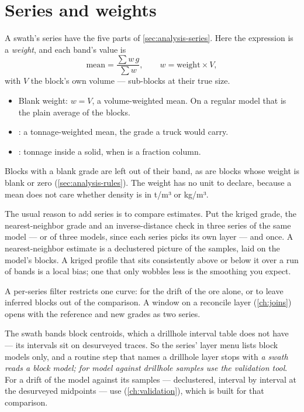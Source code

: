 \section{Series and weights}\label{sec:swath-series}
A swath's series have the five parts of \cref{sec:analysis-series}. Here the expression is a \emph{weight}, and each band's value is
\[ \text{mean} = \frac{\sum w\,g}{\sum w}, \qquad w = \text{weight} \times V , \]
with $V$ the block's own volume — sub-blocks at their true size.

\begin{itemize}
\item Blank weight: $w = V$, a volume-weighted mean. On a regular model that is the plain average of the blocks.
\item {}: a tonnage-weighted mean, the grade a truck would carry.
\item {}: tonnage inside a solid, when  is a fraction column.
\end{itemize}

Blocks with a blank grade are left out of their band, as are blocks whose weight is blank or zero (\cref{sec:analysis-rules}). The weight has no unit to declare, because a mean does not care whether density is in t/m³ or kg/m³.

The usual reason to add series is to compare estimates. Put the kriged grade, the nearest-neighbor grade and an inverse-distance check in three series of the same model — or of three models, since each series picks its own layer — and  once. A nearest-neighbor estimate is a declustered picture of the samples, laid on the model's blocks. A kriged profile that sits consistently above or below it over a run of bands is a local bias; one that only wobbles less is the smoothing you expect.

A per-series filter restricts one curve:  for the drift of the ore alone, or  to leave inferred blocks out of the comparison. A window on a reconcile layer (\cref{ch:joins}) opens with the reference and new grades as two series.

\begin{note}
The swath bands block centroids, which a drillhole interval table does not have — its intervals sit on desurveyed traces. So the series' layer menu lists block models only, and a routine step that names a drillhole layer stops with \emph{a swath reads a block model; for model against drillhole samples use the validation tool}. For a drift of the model against its samples — declustered, interval by interval at the desurveyed midpoints — use  (\cref{ch:validation}), which is built for that comparison.
\end{note}

